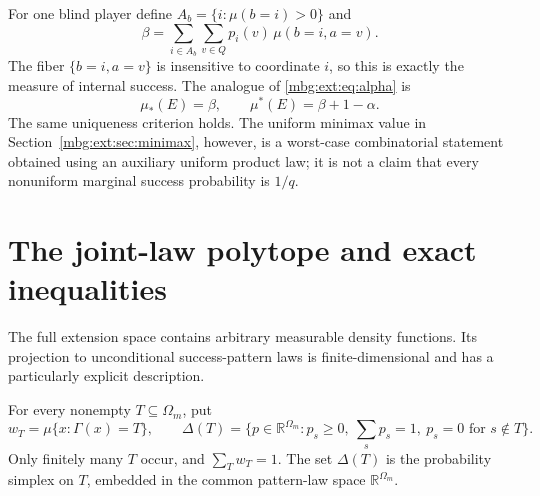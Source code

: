 \documentclass[11pt,letterpaper]{article}
\theoremstyle{definition}
\newcommand{\R}{\mathbb R}
\begin{document}
For one blind player define $A_b=\{i:\mu(b=i)>0\}$ and
\[
\beta=\sum_{i\in A_b}\sum_{v\in Q}
p_i(v)\,\mu(b=i,a=v).
\]
The fiber $\{b=i,a=v\}$ is insensitive to coordinate $i$, so this is exactly the measure of internal success. The analogue of \eqref{mbg:ext:eq:alpha} is
\begin{equation}
\mu_*(E)=\beta,\qquad \mu^*(E)=\beta+1-\alpha.
\label{mbg:ext:eq:nonuniform}
\end{equation}
The same uniqueness criterion holds. The uniform minimax value in Section~\ref{mbg:ext:sec:minimax}, however, is a worst-case combinatorial statement obtained using an auxiliary uniform product law; it is not a claim that every nonuniform marginal success probability is $1/q$.

\section{The joint-law polytope and exact inequalities}
\label{mbg:ext:sec:polytope}

The full extension space contains arbitrary measurable density functions. Its projection to unconditional success-pattern laws is finite-dimensional and has a particularly explicit description.

For every nonempty $T\subseteq\Omega_m$, put
\[
w_T=\mu\{x:\Gamma(x)=T\},
\qquad
\Delta(T)=\{p\in\R^{\Omega_m}:p_s\ge0,\ \sum_s p_s=1,
\ p_s=0\text{ for }s\notin T\}.
\]
Only finitely many $T$ occur, and $\sum_Tw_T=1$. The set $\Delta(T)$ is the probability simplex on $T$, embedded in the common pattern-law space $\R^{\Omega_m}$.
\end{document}

